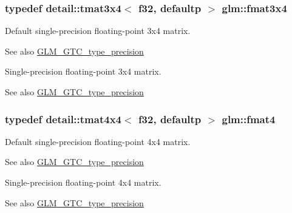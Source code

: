 \subsubsection[{\texorpdfstring{fmat3x4}{fmat3x4}}]{\setlength{\rightskip}{0pt plus 5cm}typedef detail\+::tmat3x4$<$ f32, defaultp $>$ {\bf glm\+::fmat3x4}}\hypertarget{group__gtc__type__precision_ga87084a1f4d6e8dd94f719029840dbafc}{}\label{group__gtc__type__precision_ga87084a1f4d6e8dd94f719029840dbafc}
Default single-\/precision floating-\/point 3x4 matrix. \begin{DoxySeeAlso}{See also}
\hyperlink{group__gtc__type__precision}{G\+L\+M\+\_\+\+G\+T\+C\+\_\+type\+\_\+precision}
\end{DoxySeeAlso}
Single-\/precision floating-\/point 3x4 matrix. \begin{DoxySeeAlso}{See also}
\hyperlink{group__gtc__type__precision}{G\+L\+M\+\_\+\+G\+T\+C\+\_\+type\+\_\+precision} 
\end{DoxySeeAlso}
\subsubsection[{\texorpdfstring{fmat4}{fmat4}}]{\setlength{\rightskip}{0pt plus 5cm}typedef detail\+::tmat4x4$<$ f32, defaultp $>$ {\bf glm\+::fmat4}}\hypertarget{group__gtc__type__precision_gafbea1649c5384f13ff4595c9d0003a68}{}\label{group__gtc__type__precision_gafbea1649c5384f13ff4595c9d0003a68}
Default single-\/precision floating-\/point 4x4 matrix. \begin{DoxySeeAlso}{See also}
\hyperlink{group__gtc__type__precision}{G\+L\+M\+\_\+\+G\+T\+C\+\_\+type\+\_\+precision}
\end{DoxySeeAlso}
Single-\/precision floating-\/point 4x4 matrix. \begin{DoxySeeAlso}{See also}
\hyperlink{group__gtc__type__precision}{G\+L\+M\+\_\+\+G\+T\+C\+\_\+type\+\_\+precision} 
\end{DoxySeeAlso}
